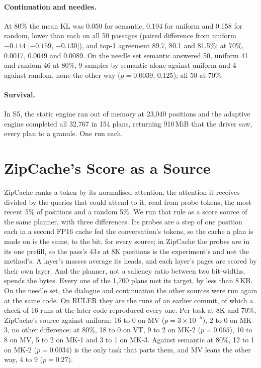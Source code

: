 \documentclass{article}
\begin{document}
\paragraph{Continuation and needles.} At 80\% the mean KL was 0.050 for semantic,
0.194 for uniform and 0.158 for random, lower than each on all 50 passages
(paired difference from uniform $-0.144$ [$-0.159$, $-0.130$]), and top-1 agreement
89.7, 80.1 and 81.5\%; at 70\%, 0.0017, 0.0049 and 0.0089. On the needle set
semantic answered 50, uniform 41 and random 46 at 80\%, 9 samples by semantic alone
against uniform and 4 against random, none the other way ($p = 0.0039$, $0.125$);
all 50 at 70\%.

\paragraph{Survival.} In S5, the static engine ran out of memory at 23{,}040
positions and the adaptive engine completed all 32{,}767 in 154 plans, returning
910\,MiB that the driver saw, every plan to a granule. One run each.

\clearpage %
\section{ZipCache's Score as a Source}
\label{app:zipcache}

ZipCache ranks a token by its normalised attention, the attention it receives
divided by the queries that could attend to it, read from probe tokens, the most
recent 5\% of positions and a random 5\%. We run that rule as a score source of
the same planner, with three differences. Its probes are a step of one position
each in a second FP16 cache fed the conversation's tokens, so the cache a plan is
made on is the same, to the bit, for every source; in ZipCache the probes are in
its one prefill, so the pass's 43\,s at 8K positions is the experiment's and not
the method's. A layer's masses average its heads, and each layer's pages are
scored by their own layer. And the planner, not a saliency ratio between two
bit-widths, spends the bytes. Every one of the 1{,}700 plans met its target, by
less than 8\,KB. On the needle set, the dialogue and continuation the other
sources were run again at the same code. On RULER they are the runs of an earlier
commit, of which a check of 16 runs at the later code reproduced every one. Per
task at 8K and 70\%, ZipCache's source against uniform: 16 to 0 on MV
($p = 3 \times 10^{-5}$), 2 to 0 on MK-3, no other difference; at 80\%, 18 to 0
on VT, 9 to 2 on MK-2 ($p = 0.065$), 10 to 8 on MV, 5 to 2 on MK-1 and 3 to 1 on
MK-3. Against semantic at 80\%, 12 to 1 on MK-2 ($p = 0.0034$) is the only task
that parts them, and MV leans the other way, 4 to 9 ($p = 0.27$).
\end{document}
